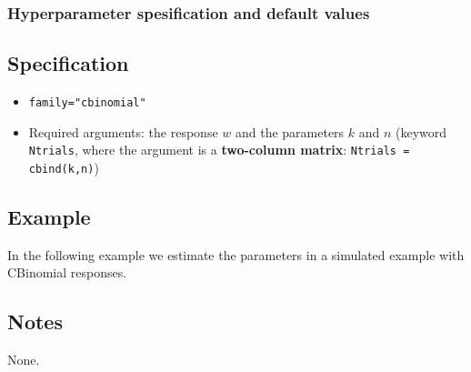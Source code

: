 \documentclass[a4paper,11pt]{article}
\begin{document}
\subsubsection*{Hyperparameter spesification and default values}


\subsection*{Specification}

\begin{itemize}
\item \texttt{family="cbinomial"}
\item Required arguments: the response $w$ and the parameters $k$ and
    $n$ (keyword \texttt{Ntrials}, where the argument is a
    \textbf{two-column matrix}: \texttt{Ntrials = cbind(k,n)})
\end{itemize}

\subsection*{Example}

In the following example we estimate the parameters in a simulated
example with CBinomial responses.%


\subsection*{Notes}

None.
\end{document}
